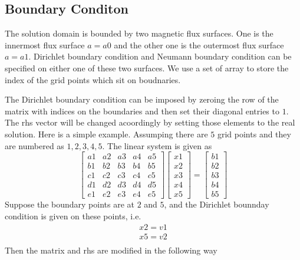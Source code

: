 \documentclass{report}
\begin{document}
\subsection{Boundary Conditon}
\label{sec:bc}
The solution domain is bounded by two magnetic flux surfaces.
One is the innermost flux surface $a=a0$ and the other one is the outermost flux surface $a=a1$.
Dirichlet boundary condition and Neumann boundary condition can be specified on
either one of these two surfaces.
We use a set of array to store the index of the grid points which sit on boudnaries.

The Dirichlet boundary condition can be imposed by
zeroing the row of the matrix with indices on the boundaries and then set their diagonal 
entries to $1$.
The rhs vector will be changed acoordingly by setting those elements to the real solution.
Here is a simple example.
Assumping there are $5$ grid points and they are numbered as $1, 2, 3, 4, 5$.
The linear system is given as
$$
\left[ \begin{array}{lllll}
         a1 & a2 & a3 & a4 & a5 \\
         b1 & b2 & b3 & b4 & b5 \\
         c1 & c2 & c3 & c4 & c5 \\
         d1 & d2 & d3 & d4 & d5 \\
         e1 & e2 & e3 & e4 & e5
\end{array} \right]
\left[ \begin{array}{l}
         x1\\
         x2\\
         x3\\
         x4\\
         x5
\end{array} \right]
=
\left[ \begin{array}{l}
         b1\\
         b2\\
         b3\\
         b4\\
         b5
\end{array} \right]
$$
Suppose the boundary points are at $2$ and $5$, and the Dirichlet bounnday condition is given on
these points, i.e.
$$
\begin{array}{l}
x2=v1\\
x5=v2\\
\end{array}
$$
Then the matrix and rhs are modified in the following way
\end{document}

